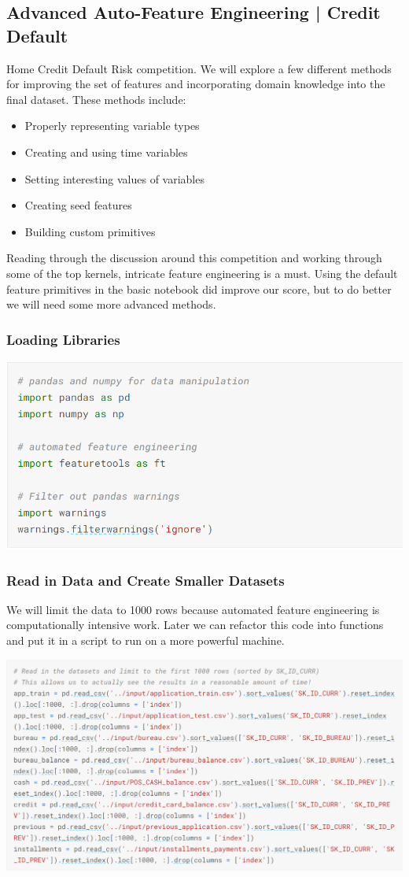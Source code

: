 \documentclass[twoside,a4paper]{article}
\begin{document}
\subsection{Advanced Auto-Feature Engineering | Credit Default}
Home Credit Default Risk competition. We will explore a few different methods for improving the set of features and incorporating domain knowledge into the final dataset. These methods include:
\begin{itemize}
\item Properly representing variable types
\item Creating and using time variables
\item Setting interesting values of variables
\item Creating seed features
\item Building custom primitives
\end{itemize}
Reading through the discussion around this competition and working through some of the top kernels, intricate feature engineering is a must. Using the default feature primitives in the basic notebook did improve our score, but to do better we will need some more advanced methods.
\subsubsection{Loading Libraries}
\includegraphics[scale=.8]{load1.png}
\clearpage %
\subsubsection{Read in Data and Create Smaller Datasets}
We will limit the data to 1000 rows because automated feature engineering is computationally intensive work. Later we can refactor this code into functions and put it in a script to run on a more powerful machine.

\includegraphics[scale=.8]{raedData.png}
\end{document}
